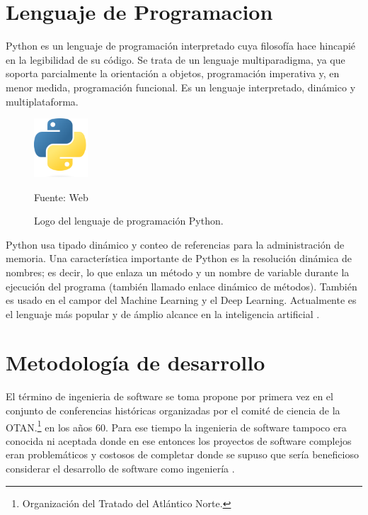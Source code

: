 \section{Lenguaje de Programacion}
Python es un lenguaje de programación interpretado cuya filosofía hace hincapié en la legibilidad de su código. Se trata de un lenguaje multiparadigma, ya que soporta parcialmente la orientación a objetos, programación imperativa y, en menor medida, programación funcional. Es un lenguaje interpretado, dinámico y multiplataforma.\\

\begin{figure}[H]
    \begin{center}
        \includegraphics[width=2cm]{img/capitulo_2/python.png}
        \caption{Logo del lenguaje de programación Python.\\}
        Fuente: Web
        \label{fig:python}
    \end{center}
\end{figure}

Python usa tipado dinámico y conteo de referencias para la administración de memoria. Una característica importante de Python es la resolución dinámica de nombres; es decir, lo que enlaza un método y un nombre de variable durante la ejecución del programa (también llamado enlace dinámico de métodos). También es usado en el campor del Machine Learning y el Deep Learning. Actualmente es el lenguaje más popular y de ámplio alcance en la inteligencia artificial \cite{python:popular}.

\section{Metodología de desarrollo}
El término de ingenieria de software se toma propone por primera vez en el conjunto de conferencias históricas organizadas por el comité de ciencia de la OTAN.\footnote{Organización del Tratado del Atlántico Norte.} en los años 60. Para ese tiempo la ingenieria de software tampoco era conocida ni aceptada donde en ese entonces los proyectos de software complejos eran problemáticos y costosos de completar donde se supuso que sería beneficioso considerar el desarrollo de software como ingeniería \cite{Ganis}.\\

